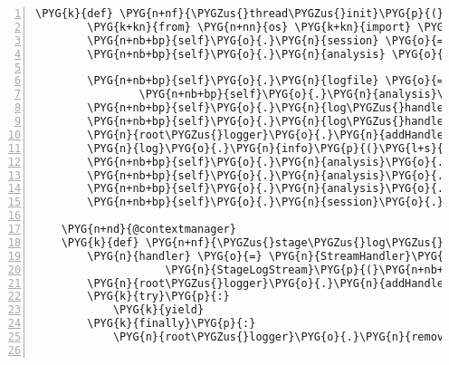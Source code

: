 \begin{Verbatim}[commandchars=\\\{\},numbers=left,firstnumber=1,stepnumber=5]
    \PYG{k}{def} \PYG{n+nf}{\PYGZus{}thread\PYGZus{}init}\PYG{p}{(}\PYG{n+nb+bp}{self}\PYG{p}{)}\PYG{p}{:}
        \PYG{k+kn}{from} \PYG{n+nn}{os} \PYG{k+kn}{import} \PYG{n}{path}
        \PYG{n+nb+bp}{self}\PYG{o}{.}\PYG{n}{session} \PYG{o}{=} \PYG{n}{DBSession}\PYG{p}{(}\PYG{n}{bind}\PYG{o}{=}\PYG{n}{create\PYGZus{}engine}\PYG{p}{(}\PYG{n}{rnaseqlyze}\PYG{o}{.}\PYG{n}{db\PYGZus{}url}\PYG{p}{)}\PYG{p}{)}
        \PYG{n+nb+bp}{self}\PYG{o}{.}\PYG{n}{analysis} \PYG{o}{=} \PYG{n+nb+bp}{self}\PYG{o}{.}\PYG{n}{session}\PYG{o}{.}\PYG{n}{query}\PYG{p}{(}\PYG{n}{Analysis}\PYG{p}{)}\PYG{o}{.}\PYG{n}{get}\PYG{p}{(}\PYG{n+nb+bp}{self}\PYG{o}{.}\PYG{n}{analysis\PYGZus{}id}\PYG{p}{)}

        \PYG{n+nb+bp}{self}\PYG{o}{.}\PYG{n}{logfile} \PYG{o}{=} \PYG{n+nb}{open}\PYG{p}{(}\PYG{n}{path}\PYG{o}{.}\PYG{n}{join}\PYG{p}{(}
                \PYG{n+nb+bp}{self}\PYG{o}{.}\PYG{n}{analysis}\PYG{o}{.}\PYG{n}{data\PYGZus{}dir}\PYG{p}{,} \PYG{l+s}{"}\PYG{l+s}{rna-seqlyze-worker.log}\PYG{l+s}{"}\PYG{p}{)}\PYG{p}{,} \PYG{l+s}{"}\PYG{l+s}{w}\PYG{l+s}{"}\PYG{p}{)}
        \PYG{n+nb+bp}{self}\PYG{o}{.}\PYG{n}{log\PYGZus{}handler} \PYG{o}{=} \PYG{n}{StreamHandler}\PYG{p}{(}\PYG{n+nb+bp}{self}\PYG{o}{.}\PYG{n}{logfile}\PYG{p}{)}
        \PYG{n+nb+bp}{self}\PYG{o}{.}\PYG{n}{log\PYGZus{}handler}\PYG{o}{.}\PYG{n}{setFormatter}\PYG{p}{(}\PYG{n}{Formatter}\PYG{p}{(}\PYG{n}{log\PYGZus{}format}\PYG{p}{)}\PYG{p}{)}
        \PYG{n}{root\PYGZus{}logger}\PYG{o}{.}\PYG{n}{addHandler}\PYG{p}{(}\PYG{n+nb+bp}{self}\PYG{o}{.}\PYG{n}{log\PYGZus{}handler}\PYG{p}{)}
        \PYG{n}{log}\PYG{o}{.}\PYG{n}{info}\PYG{p}{(}\PYG{l+s}{"}\PYG{l+s}{starting work on analysis \PYGZsh{}}\PYG{l+s+si}{\PYGZpc{}d}\PYG{l+s}{"} \PYG{o}{\PYGZpc{}} \PYG{n+nb+bp}{self}\PYG{o}{.}\PYG{n}{analysis\PYGZus{}id}\PYG{p}{)}
        \PYG{n+nb+bp}{self}\PYG{o}{.}\PYG{n}{analysis}\PYG{o}{.}\PYG{n}{finished} \PYG{o}{=} \PYG{n+nb+bp}{False}
        \PYG{n+nb+bp}{self}\PYG{o}{.}\PYG{n}{analysis}\PYG{o}{.}\PYG{n}{started} \PYG{o}{=} \PYG{n+nb+bp}{True}
        \PYG{n+nb+bp}{self}\PYG{o}{.}\PYG{n}{analysis}\PYG{o}{.}\PYG{n}{error} \PYG{o}{=} \PYG{n+nb+bp}{None}
        \PYG{n+nb+bp}{self}\PYG{o}{.}\PYG{n}{session}\PYG{o}{.}\PYG{n}{commit}\PYG{p}{(}\PYG{p}{)}

    \PYG{n+nd}{@contextmanager}
    \PYG{k}{def} \PYG{n+nf}{\PYGZus{}stage\PYGZus{}log\PYGZus{}manager}\PYG{p}{(}\PYG{n+nb+bp}{self}\PYG{p}{,} \PYG{n}{stage}\PYG{p}{)}\PYG{p}{:}
        \PYG{n}{handler} \PYG{o}{=} \PYG{n}{StreamHandler}\PYG{p}{(}
                    \PYG{n}{StageLogStream}\PYG{p}{(}\PYG{n+nb+bp}{self}\PYG{o}{.}\PYG{n}{analysis}\PYG{p}{,} \PYG{n}{stage}\PYG{p}{,} \PYG{n+nb+bp}{self}\PYG{o}{.}\PYG{n}{session}\PYG{p}{)}\PYG{p}{)}
        \PYG{n}{root\PYGZus{}logger}\PYG{o}{.}\PYG{n}{addHandler}\PYG{p}{(}\PYG{n}{handler}\PYG{p}{)}
        \PYG{k}{try}\PYG{p}{:}
            \PYG{k}{yield}
        \PYG{k}{finally}\PYG{p}{:}
            \PYG{n}{root\PYGZus{}logger}\PYG{o}{.}\PYG{n}{removeHandler}\PYG{p}{(}\PYG{n}{handler}\PYG{p}{)}


\end{Verbatim}

